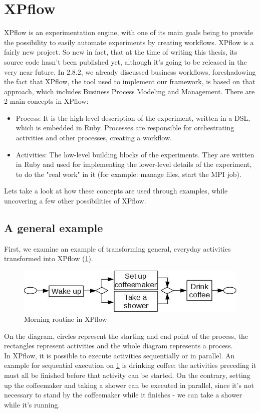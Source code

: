 \section{XPflow}
XPflow is an experimentation engine, with one of its main goals being
to provide the possibility to easily automate experiments by creating
workflows. XPflow is a fairly new project. So new in fact, that at the
time of writing this thesis, its source code hasn't been published
yet, although it's going to be released in the very near future.
In 2.8.2, we already discussed business workflows, foreshadowing the
fact that XPflow, the tool used to implement our framework, is based
on that approach, which includes Business Process Modeling and
Management. There are 2 main concepts in XPflow\cite{bn12_2}:
\begin{itemize}
\item Process: It is the high-level description of the experiment,
  written in a DSL, which is embedded in Ruby. Processes are
  responsible for orchestrating activities and other processes,
  creating a workflow.
\item Activities: The low-level building blocks of the
  experiments. They are written in Ruby and used for implementing the
  lower-level details of the experiment, to do the "real work" in it
  (for example: manage files, start the MPI job).
\end{itemize}
Lets take a look at how these concepts are used through
examples, while uncovering a few other possibilities of XPflow.
\subsection{A general example}
First, we examine an example of transforming general, everyday
activities transformed into XPflow (\ref{fig:xpflow_example1}).
\begin{figure}[htbp]
  \centering
    \includegraphics[scale=0.7]{./Figures/xpflow_example1.jpg}
  \caption[dayum]{Morning routine in XPflow}
  \label{fig:xpflow_example1}
\end{figure}
On the diagram, circles represent the starting and end point of the
process, the rectangles represent activities and the whole diagram
represents a process.\\
In XPflow, it is possible to execute activities sequentially or in
parallel. An example for sequential execution on
\ref{fig:xpflow_example1} is drinking coffee: the activities preceding
it must all be finished before that activity can be
started. On the contrary, setting up the coffeemaker and taking a
shower can be executed in parallel, since it's not necessary to stand
by the coffeemaker while it finishes - we can take a shower while it's
running.
